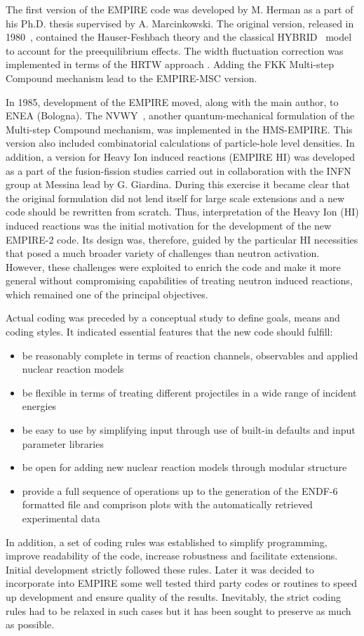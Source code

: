 \documentclass[twocolumn,amsmath,amssymb,10pt,groupedaddress,a4paper]{revtex4}
\begin{document}
The first version of the EMPIRE code was developed by M. Herman as a part of his Ph.D. thesis supervised by A. Marcinkowski. The original version, released in 1980~\cite{EMPIRE-I},
contained the Hauser-Feshbach theory and the
classical HYBRID~\cite{hybrid, hybrid1, hybrid2, hybrid3} model to account for the preequilibrium
effects. The width fluctuation correction was implemented in terms
of the HRTW approach \cite{HRTW,HHM}. Adding the FKK Multi-step Compound
mechanism \cite{FKK} lead to the EMPIRE-MSC version.

In 1985, development of the EMPIRE moved, along with the main author, to ENEA (Bologna).
The NVWY~\cite{NVWY}, another quantum-mechanical formulation of the Multi-step Compound mechanism,
was implemented in the HMS-EMPIRE. This version also
included combinatorial calculations of particle-hole level densities.
In addition, a version for Heavy Ion induced reactions (EMPIRE HI)
was developed as a part of the fusion-fission studies carried out in collaboration with the INFN group at Messina lead by G. Giardina. During this exercise it became clear that the original formulation did not lend itself for large scale extensions and a new code should be rewritten from scratch. Thus, interpretation of the Heavy Ion (HI) induced reactions was the initial motivation for the development of the new EMPIRE-2 code. Its design was, therefore,  guided by the particular HI necessities that posed a much broader variety of challenges than neutron activation. However, these challenges were exploited to enrich the code and make it more general without compromising capabilities of treating neutron induced reactions, which remained one of the principal objectives.

Actual coding was preceded by a conceptual study to define goals, means and coding styles. It indicated essential features that the new code should fulfill:
\begin{itemize}
\item be reasonably complete in terms of reaction channels, observables and applied nuclear reaction models
\item be flexible in terms of treating different projectiles in a  wide range of incident energies
\item be easy to use by simplifying input through use of built-in defaults and input parameter libraries
\item be open for adding new nuclear reaction models through modular structure
\item provide a full sequence of operations  up to the generation of the ENDF-6 formatted file and comprison plots with the automatically retrieved experimental data
\end{itemize}
In addition, a set of coding rules was established to simplify programming, improve readability of the code, increase robustness and facilitate extensions. Initial development strictly followed these rules. Later it was decided to incorporate into EMPIRE some well tested third party codes or routines to speed up development and ensure quality of the results. Inevitably, the strict coding rules had to be relaxed in such cases but it has been sought to preserve as much as possible.
\end{document}
